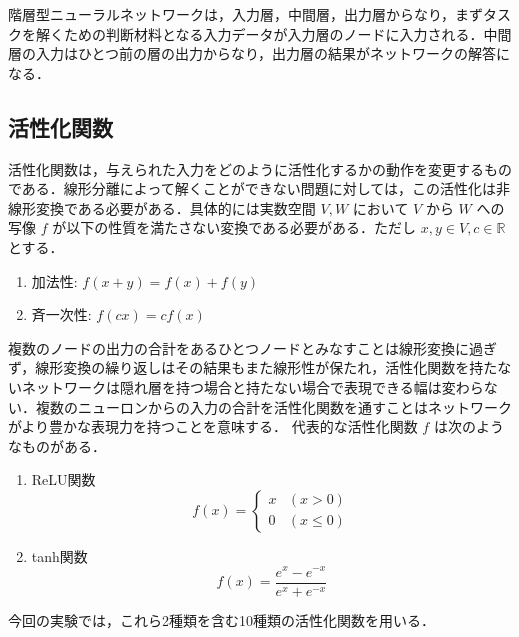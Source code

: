 階層型ニューラルネットワークは，入力層，中間層，出力層からなり，まずタスクを解くための判断材料となる入力データが入力層のノードに入力される．中間層の入力はひとつ前の層の出力からなり，出力層の結果がネットワークの解答になる．\\

\subsection{活性化関数}
活性化関数は，与えられた入力をどのように活性化するかの動作を変更するものである．線形分離によって解くことができない問題に対しては，この活性化は非線形変換である必要がある\cite{活性化関数}．具体的には実数空間 $ V, W $ において  $ V $ から $ W $ への写像 $ f $ が以下の性質を満たさない変換である必要がある．ただし $ x, y \in V, c \in \mathbb{R} $ とする．

\begin{enumerate}
    \item 加法性: $ f(x + y) = f(x) + f(y) $ 
    \item 斉一次性: $ f(cx) = cf(x) $
\end{enumerate}

複数のノードの出力の合計をあるひとつノードとみなすことは線形変換に過ぎず，線形変換の繰り返しはその結果もまた線形性が保たれ，活性化関数を持たないネットワークは隠れ層を持つ場合と持たない場合で表現できる幅は変わらない．複数のニューロンからの入力の合計を活性化関数を通すことはネットワークがより豊かな表現力を持つことを意味する．
代表的な活性化関数 $ f $ は次のようなものがある．

\begin{enumerate}
    \item ReLU関数
    \begin{equation}
        f(x) = 
        \begin{cases}
        x & (x > 0)\\
        0 & (x \leq 0)
        \end{cases}
    \end{equation}

    \item tanh関数
    \begin{equation}
        f(x) = \frac{e^{x} - e^{-x}}{e^{x} + e^{-x}}
    \end{equation}
\end{enumerate}

今回の実験では，これら2種類を含む10種類の活性化関数を用いる．